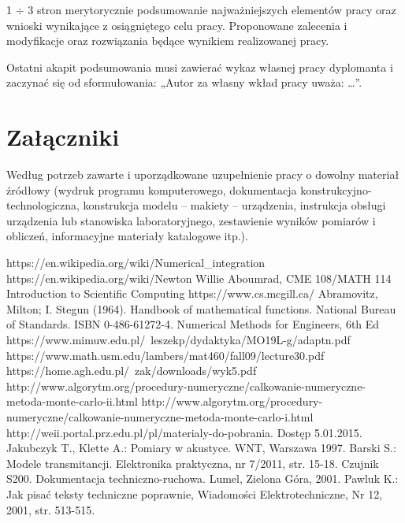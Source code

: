 \documentclass[12pt,twoside]{article}
\begin{document}
1 $\div$ 3 stron merytorycznie podsumowanie najważniejszych elementów pracy oraz wnioski wynikające z osiągniętego celu pracy. Proponowane zalecenia i modyfikacje oraz rozwiązania będące wynikiem realizowanej pracy.

Ostatni akapit podsumowania musi zawierać wykaz własnej pracy dyplomanta i zaczynać się od sformułowania: „Autor za własny wkład pracy uważa: \ldots”.

\clearpage

\section*{Załączniki}

Według potrzeb zawarte i uporządkowane uzupełnienie pracy o dowolny materiał źródłowy (wydruk programu komputerowego, dokumentacja kons\-truk\-cyj\-no-\-tech\-no\-lo\-gicz\-na, konstrukcja modelu -- makiety -- urządzenia, instrukcja obsługi urządzenia lub stanowiska laboratoryjnego, zestawienie wyników pomiarów i obliczeń, informacyjne materiały katalogowe itp.).


\clearpage


\begin{thebibliography}{4}
 https://en.wikipedia.org/wiki/Numerical\_integration
 https://en.wikipedia.org/wiki/Newton%
 Willie Aboumrad, CME 108/MATH 114 Introduction to Scientific Computing
 https://www.cs.mcgill.ca/
 Abramovitz, Milton; I. Stegun (1964). Handbook of mathematical functions. National Bureau of Standards. ISBN 0-486-61272-4.
 Numerical Methods for Engineers, 6th Ed
 https://www.mimuw.edu.pl/~leszekp/dydaktyka/MO19L-g/adaptn.pdf
 https://www.math.usm.edu/lambers/mat460/fall09/lecture30.pdf
 https://home.agh.edu.pl/~zak/downloads/wyk5.pdf
 http://www.algorytm.org/procedury-numeryczne/calkowanie-numeryczne-metoda-monte-carlo-ii.html
 http://www.algorytm.org/procedury-numeryczne/calkowanie-numeryczne-metoda-monte-carlo-i.html
 http://weii.portal.prz.edu.pl/pl/materialy-do-pobrania. Dostęp 5.01.2015.
 Jakubczyk T., Klette A.: Pomiary w akustyce. WNT, Warszawa 1997.
 Barski S.: Modele transmitancji. Elektronika praktyczna, nr 7/2011, str. 15-18.
 Czujnik S200. Dokumentacja techniczno-ruchowa. Lumel, Zielona Góra, 2001.
 Pawluk K.: Jak pisać teksty techniczne poprawnie, Wiadomości Elektrotechniczne, Nr 12, 2001, str. 513-515.
\end{thebibliography}

\clearpage

\makesummary
\end{document}
